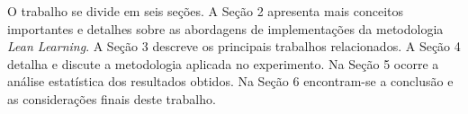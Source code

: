 O trabalho se divide em seis seções. A Seção 2 apresenta mais conceitos importantes e detalhes sobre as abordagens de implementações da metodologia \textit{Lean Learning}. A Seção 3 descreve os principais trabalhos relacionados. A Seção 4 detalha e discute a metodologia aplicada no experimento. Na Seção 5 ocorre a análise estatística dos resultados obtidos. Na Seção 6 encontram-se a conclusão e as considerações finais deste trabalho.
